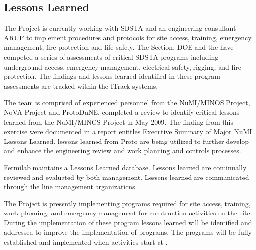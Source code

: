 \subsection{Lessons Learned}

The  Project is currently working with SDSTA and an
engineering consultant ARUP to implement  procedures and
protocols for site access, training, emergency management, fire
protection and life safety. The \fnal {} Section, DOE and the
  have competed a series of assessments of
critical SDSTA  programs including underground access,
emergency management, electrical safety, rigging, and fire
protection. The findings and lessons learned identified in these
 program assessments are tracked within the \fnal ITrack
systems.

The  team is comprised of experienced personnel from the
NuMI/MINOS Project, NoVA Project and ProtoDuNE.  \fnal completed a
review to identify critical lessons learned from the NuMI/MINOS
Project in May 2009. The finding from this exercise were documented in
a report entitles Executive Summary of Major NuMI Lessons Learned.
 lessons learned from Proto are being utilized
to further develop and enhance the  engineering review and
work planning and controls processes.

Fermilab maintains a Lessons Learned database. Lessons learned are
continually reviewed and evaluated by both \fnal
management. Lessons learned are communicated through the line
management organizations.

The  Project is presently implementing 
programs required for site access, training, work planning, and
emergency management for construction activities on the \surf
site. During the implementation of these program lessons learned will
be identified and addressed to improve the implementation of
 programs.  The  programs will be fully
established and implemented when  activities start at
\surf.
